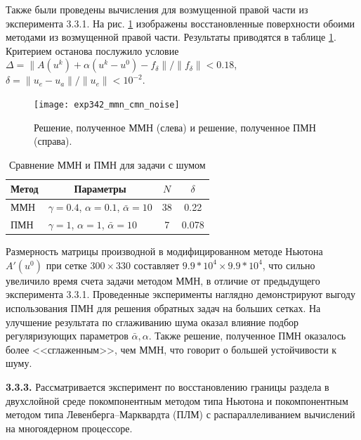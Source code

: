 Также были проведены вычисления для возмущенной правой части из эксперимента 3.3.1. На рис. \ref{fig:exp342_mmn_cmn_noise} изображены восстановленные поверхности обоими методами из возмущенной правой части. Результаты приводятся в таблице \ref{table3.6}. Критерием останова послужило условие $\Delta=\|A(u^k)+\alpha(u^k-u^0)-f_\delta\|/\|f_\delta\|<0.18$, $\delta=\|u_e-u_a\|/\|u_e\|<10^{-2}$.
\begin{figure}
	\centering
	\texttt{[image: exp342\_mmn\_cmn\_noise]}
	\caption{Решение, полученное ММН (слева) и решение, полученное ПМН (справа).}
	\label{fig:exp342_mmn_cmn_noise}
\end{figure}
\begin{table}[]
	\centering
	\caption{Сравнение ММН и ПМН для задачи с шумом}
	\label{table3.6}
	\begin{tabular}{|l|l|c|c|}
		\hline
		\multicolumn{1}{|c|}{Метод} & \multicolumn{1}{c|}{Параметры}              & $N$ & $\delta$ \\ \hline
		ММН                         & $\gamma =0.4$, $\alpha=0.1$, $\bar\alpha=10$ & 38   & 0.22     \\ \hline
		ПМН                         & $\gamma =1$, $\alpha=1$, $\bar\alpha=10$    & 7   & 0.078    \\ \hline
	\end{tabular}
\end{table}

Размерность матрицы производной в модифицированном методе Ньютона $A'(u^0)$ при сетке $300\times330$ составляет $9.9 * 10^4\times 9.9 * 10^4$, что сильно увеличило время счета задачи методом ММН, в отличие от предыдущего эксперимента 3.3.1. Проведенные эксперименты наглядно демонстрируют выгоду использования ПМН для решения обратных задач на больших сетках. На улучшение результата по сглаживанию шума оказал влияние подбор регуляризующих параметров $\bar{\alpha}, \alpha$. Также решение, полученное ПМН оказалось более <<сглаженным>>, чем ММН, что говорит о большей устойчивости к шуму.
 
 {\bfseries 3.3.3.} Рассматривается эксперимент по восстановлению границы раздела в двухслойной среде покомпонентным методом типа Ньютона и покомпонентным методом типа Левенберга--Марквардта (ПЛМ)  с распараллеливанием вычислений на многоядерном процессоре.
 
